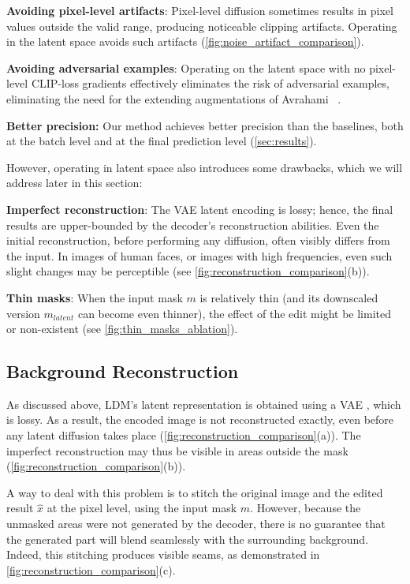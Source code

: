\textbf{Avoiding pixel-level artifacts}: Pixel-level diffusion sometimes results in pixel values outside the valid range, producing noticeable clipping artifacts. Operating in the latent space avoids such artifacts (\ref{fig:noise_artifact_comparison}).

\textbf{Avoiding adversarial examples}: Operating on the latent space with no pixel-level CLIP-loss gradients effectively eliminates the risk of adversarial examples, eliminating the need for the extending augmentations of Avrahami \etal~.

\textbf{Better precision:} Our method achieves better precision than the baselines, both at the batch level and at the final prediction level (\ref{sec:results}).

However, operating in latent space also introduces some drawbacks, which we will address later in this section:

\textbf{Imperfect reconstruction}: The VAE latent encoding is lossy; hence, the final results are upper-bounded by the decoder's reconstruction abilities. Even the initial reconstruction, before performing any diffusion, often visibly differs from the input. In images of human faces, or images with high frequencies, even such slight changes may be perceptible (see \ref{fig:reconstruction_comparison}(b)).

\textbf{Thin masks}: When the input mask $m$ is relatively thin (and its downscaled version $m_{\textit{latent}}$ can become even thinner), the effect of the edit might be limited or non-existent (see \ref{fig:thin_masks_ablation}).

\subsection{Background Reconstruction}
\label{sec:handling_innacurate_reconstruction}

As discussed above, LDM's latent representation is obtained using a VAE \cite{kingma2013auto}, which is lossy. As a result, the encoded image is not reconstructed exactly, even before any latent diffusion takes place (\ref{fig:reconstruction_comparison}(a)). The imperfect reconstruction may thus be visible in areas outside the mask (\ref{fig:reconstruction_comparison}(b)). 

A \naive{} way to deal with this problem is to stitch the original image and the edited result $\hat{x}$ at the pixel level, using the input mask $m$. However, because the unmasked areas were not generated by the decoder, there is no guarantee that the generated part will blend seamlessly with the surrounding background. Indeed, this \naive{} stitching produces visible seams, as demonstrated in \ref{fig:reconstruction_comparison}(c).

